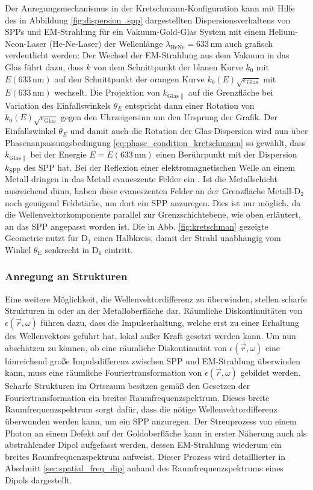 \documentclass[a4paper, titlepage,  ngerman, fullpage]{book}
\begin{document}
	Der Anregungsmechanismus in der Kretschmann-Konfiguration kann mit Hilfe des in Abbildung \ref{fig:dispersion_spp} dargestellten Dispersionsverhaltens von SPPs und EM-Strahlung für ein Vakuum-Gold-Glas System mit einem Helium-Neon-Laser (He-Ne-Laser) der Wellenlänge $\lambda_{\mathrm{HeNe}}=633\,\mathrm{nm}$ auch grafisch verdeutlicht werden: Der Wechsel der EM-Strahlung aus dem Vakuum in das Glas führt dazu, dass $k$ von dem Schnittpunkt der blauen Kurve $k_0$ mit $E(633 \, \mathrm{nm})$ auf den Schnittpunkt der orangen Kurve $k_0(E)\sqrt{\epsilon_\mathrm{Glas}}$ mit $E(633 \, \mathrm{nm})$ wechselt. Die Projektion von $k_{\mathrm{Glas}\parallel}$ auf die Grenzfläche bei Variation des Einfallswinkels $\theta_E$ entspricht dann einer Rotation von $k_0(E)\sqrt{\epsilon_\mathrm{Glas}}$ gegen den Uhrzeigersinn um den Ursprung der Grafik. Der Einfallswinkel  $\theta_E$ und damit auch die Rotation der Glas-Dispersion wird nun über Phasenanpassungsbedingung \eqref{eq:phase_condition_kretschmann} so gewählt, dass $k_{\mathrm{Glas}\parallel}$ bei der Energie $E=E(633\,\mathrm{nm})$ einen Berührpunkt mit der Dispersion $k_\mathrm{SPP}$ des SPP hat.
	Bei der Reflexion einer elektromagnetischen Welle an einem Metall dringen in das Metall evaneszente Felder ein \cite{Novotny.2012b}. Ist die Metallschicht ausreichend dünn, haben diese evaneszenten Felder an der Grenzfläche Metall-$\mathrm{D}_2$ noch genügend Feldstärke, um dort ein SPP anzuregen. Dies ist nur möglich, da die Wellenvektorkomponente parallel zur Grenzschichtebene, wie oben erläutert, an das SPP angepasst worden ist. Die in Abb. \ref{fig:kretschman} gezeigte Geometrie nutzt für $\mathrm{D}_1$ einen Halbkreis, damit der Strahl unabhängig vom Winkel $\theta_\mathrm{E}$ senkrecht in $\mathrm{D}_1$ eintritt. \cite{Kretschmann.1971}
	\subsubsection{Anregung an Strukturen}
	Eine weitere Möglichkeit, die Wellenvektordifferenz zu überwinden, stellen scharfe Strukturen in oder an der Metalloberfläche dar. Räumliche Diskontinuitäten von $\epsilon(\vec{r},\omega)$ führen dazu, dass die Impulserhaltung, welche erst zu einer Erhaltung des Wellenvektors geführt hat, lokal außer Kraft gesetzt werden kann. Um nun abschätzen zu können, ob eine räumliche Diskontinuität von $\epsilon(\vec{r},\omega)$ eine hinreichend große Impulsdifferenz zwischen SPP und EM-Strahlung überwinden kann, muss eine räumliche Fouriertransformation von $\epsilon(\vec{r},\omega)$ gebildet werden. Scharfe Strukturen im Ortsraum besitzen gemäß den Gesetzen der Fouriertransformation ein breites Raumfrequenzspektrum. Dieses breite Raumfrequenzspektrum sorgt dafür, dass die nötige Wellenvektordifferenz überwunden werden kann, um ein SPP anzuregen. Der Streuprozess von einem Photon an einem Defekt auf der Goldoberfläche kann in erster Näherung auch als abstrahlender Dipol aufgefasst werden, dessen EM-Strahlung wiederum ein breites Raumfrequenzspektrum aufweist. Dieser Prozess wird detaillierter in Abschnitt \ref{sec:spatial_freq_dip} anhand des Raumfrequenzspektrums eines Dipols dargestellt. \cite{Maier.2007}
\end{document}
